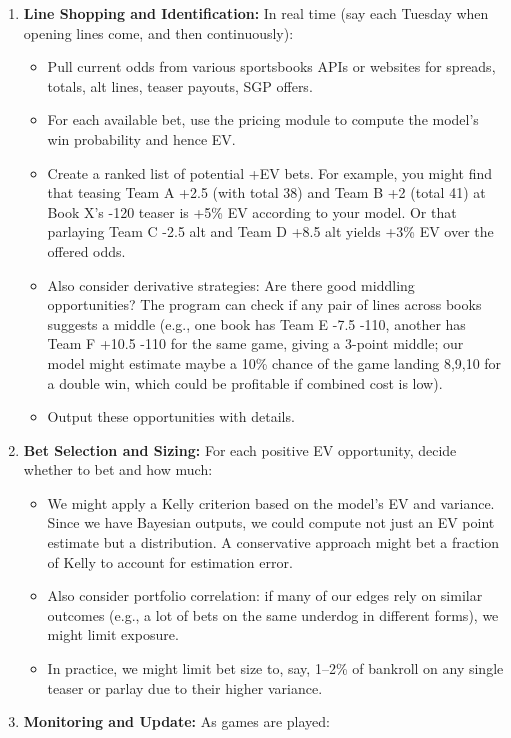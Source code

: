 \documentclass[12pt]{article}
\begin{document}
\begin{enumerate}
\begin{itemize}
    \end{itemize}
    \item \textbf{Line Shopping and Identification:} In real time (say each Tuesday when opening lines come, and then continuously):
    \begin{itemize}
        \item Pull current odds from various sportsbooks APIs or websites for spreads, totals, alt lines, teaser payouts, SGP offers.
        \item For each available bet, use the pricing module to compute the model’s win probability and hence EV.
        \item Create a ranked list of potential +EV bets. For example, you might find that teasing Team A +2.5 (with total 38) and Team B +2 (total 41) at Book X’s -120 teaser is +5\% EV according to your model. Or that parlaying Team C -2.5 alt and Team D +8.5 alt yields +3\% EV over the offered odds.
        \item Also consider derivative strategies: Are there good middling opportunities? The program can check if any pair of lines across books suggests a middle (e.g., one book has Team E -7.5 -110, another has Team F +10.5 -110 for the same game, giving a 3-point middle; our model might estimate maybe a 10\% chance of the game landing 8,9,10 for a double win, which could be profitable if combined cost is low).
        \item Output these opportunities with details.
    \end{itemize}
    \item \textbf{Bet Selection and Sizing:} For each positive EV opportunity, decide whether to bet and how much:
    \begin{itemize}
        \item We might apply a Kelly criterion based on the model’s EV and variance. Since we have Bayesian outputs, we could compute not just an EV point estimate but a distribution. A conservative approach might bet a fraction of Kelly to account for estimation error.
        \item Also consider portfolio correlation: if many of our edges rely on similar outcomes (e.g., a lot of bets on the same underdog in different forms), we might limit exposure.
        \item In practice, we might limit bet size to, say, 1--2\% of bankroll on any single teaser or parlay due to their higher variance.
    \end{itemize}
    \item \textbf{Monitoring and Update:} As games are played:

\end{enumerate}
\end{document}
